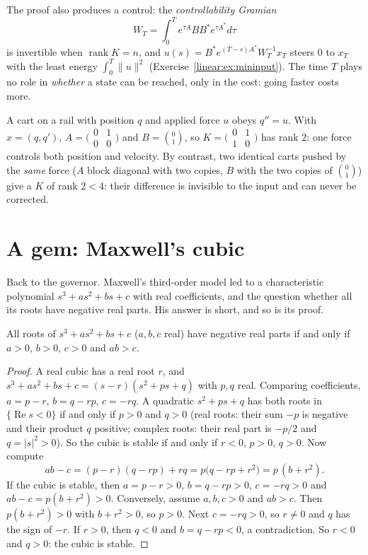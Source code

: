 The proof also produces a control: the \emph{controllability Gramian}
\[
W_T=\int_0^Te^{\tau A}BB^*e^{\tau A^*}d\tau
\]
 is invertible when
$\operatorname{rank}K=n$, and $u(s)=B^*e^{(T-s)A^*}W_T^{-1}x_T$ steers $0$ to $x_T$ with the least energy $\int_0^T\|u\|^2$ (Exercise~\ref{linear:ex:mininput}).
The time $T$ plays no role in \emph{whether} a state can be reached, only in the cost: going faster costs more.

\begin{example}\label{linear:exa:doubleintegrator}
A cart on a rail with position $q$ and applied force $u$ obeys $q''=u$. With $x=(q,q')$, $A=\bigl(\begin{smallmatrix}0&1\\0&0\end{smallmatrix}
\bigr)$ and $B=\binom01$, so $K=\bigl(\begin{smallmatrix}0&1\\1&0\end{smallmatrix}\bigr)$ has rank $2$: one force controls both position and
velocity. By contrast, two identical carts pushed by the \emph{same} force ($A$ block diagonal with two copies, $B$ with the two copies of
$\binom01$) give a $K$ of rank $2<4$: their difference is invisible to the input and can never be corrected.
\end{example}

\section{A gem: Maxwell's cubic}

Back to the governor. Maxwell's third-order model led to a characteristic polynomial $s^3+as^2+bs+c$ with real coefficients, and the
question whether all its roots have negative real parts. His answer is short, and so is its proof.

\begin{theorem}[Maxwell, 1868]\label{linear:thm:maxwell}
All roots of $s^3+as^2+bs+c$ ($a,b,c$ real) have negative real parts if and only if $a>0$, $b>0$, $c>0$ and $ab>c$.
\end{theorem}
\begin{proof}
A real cubic has a real root $r$, and $s^3+as^2+bs+c=(s-r)(s^2+ps+q)$ with $p,q$ real. Comparing coefficients, $a=p-r$, $b=q-rp$,
$c=-rq$. A quadratic $s^2+ps+q$ has both roots in $\{\operatorname{Re}s<0\}$ if and only if $p>0$ and $q>0$ (real roots: their sum $-p$ is
negative and their product $q$ positive; complex roots: their real part is $-p/2$ and $q=|s|^2>0$). So the cubic is stable if and only if
$r<0$, $p>0$, $q>0$. Now compute
\[
ab-c=(p-r)(q-rp)+rq=p\bigl(q-rp+r^2\bigr)=p\,(b+r^2).
\]
If the cubic is stable, then $a=p-r>0$, $b=q-rp>0$, $c=-rq>0$ and $ab-c=p(b+r^2)>0$. Conversely, assume $a,b,c>0$ and $ab>c$. Then
$p(b+r^2)>0$ with $b+r^2>0$, so $p>0$. Next $c=-rq>0$, so $r\ne0$ and $q$ has the sign of $-r$. If $r>0$, then $q<0$ and $b=q-rp<0$,
a contradiction. So $r<0$ and $q>0$: the cubic is stable.
\end{proof}

